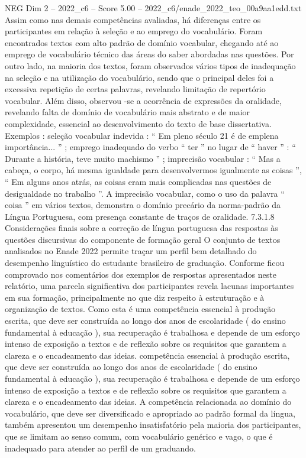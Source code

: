 \begin{textsample}{NEG Dim 2 – 2022\_c6 – Score 5.00 – 2022\_c6/enade\_2022\_teo\_00a9aa1edd.txt}
Assim como nas demais competências avaliadas, há diferenças entre os participantes em relação à seleção e ao emprego do vocabulário.
Foram encontrados textos com alto padrão de domínio vocabular, chegando até ao emprego de vocabulário técnico das áreas do saber abordadas nas questões.
Por outro lado, na maioria dos textos, foram observados vários tipos de inadequação na seleção e na utilização do vocabulário, sendo que o principal deles foi a excessiva repetição de certas palavras, revelando limitação de repertório vocabular.
Além disso, observou -se a ocorrência de expressões da oralidade, revelando falta de domínio de vocabulário mais abstrato e de maior complexidade, essencial ao desenvolvimento do texto de base dissertativa.
Exemplos : seleção vocabular indevida : “ Em pleno século 21 é de emplena importância... ” ; emprego inadequado do verbo “ ter ” no lugar de “ haver ” : “ Durante a história, teve muito machismo ” ; imprecisão vocabular : “ Mas a cabeça, o corpo, há mesma igualdade para desenvolvermos igualmente as coisas ”, “ Em alguns anos atrás, as coisas eram mais complicadas nas questões de desigualdade no trabalho ”.
A imprecisão vocabular, como o uso da palavra “ coisa ” em vários textos, demonstra o domínio precário da norma-padrão da Língua Portuguesa, com presença constante de traços de oralidade. 7.3.1.8 Considerações finais sobre a correção de língua portuguesa das respostas às questões discursivas do componente de formação geral O conjunto de textos analisados no Enade 2022 permite traçar um perfil bem detalhado do desempenho linguístico do estudante brasileiro de graduação.
Conforme ficou comprovado nos comentários dos exemplos de respostas apresentados neste relatório, uma parcela significativa dos participantes revela lacunas importantes em sua formação, principalmente no que diz respeito à estruturação e à organização de textos.
Como esta é uma competência essencial à produção escrita, que deve ser construída ao longo dos anos de escolaridade ( do ensino fundamental à educação ), sua recuperação é trabalhosa e depende de um esforço intenso de exposição a textos e de reflexão sobre os requisitos que garantem a clareza e o encadeamento das ideias. competência essencial à produção escrita, que deve ser construída ao longo dos anos de escolaridade ( do ensino fundamental à educação ), sua recuperação é trabalhosa e depende de um esforço intenso de exposição a textos e de reflexão sobre os requisitos que garantem a clareza e o encadeamento das ideias.
A competência relacionada ao domínio do vocabulário, que deve ser diversificado e apropriado ao padrão formal da língua, também apresentou um desempenho insatisfatório pela maioria dos participantes, que se limitam ao senso comum, com vocabulário genérico e vago, o que é inadequado para atender ao perfil de um graduando.

\end{textsample}
